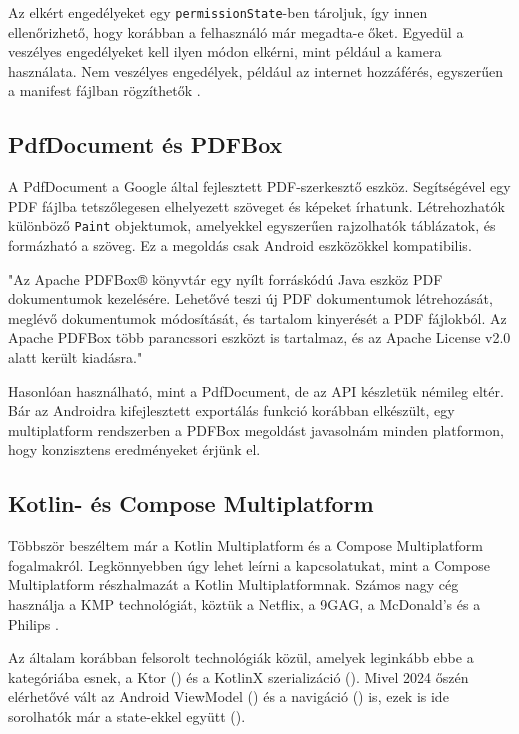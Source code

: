 Az elkért engedélyeket egy \texttt{permissionState}-ben tároljuk, így innen ellenőrizhető, hogy korábban a felhasználó már megadta-e őket.  
Egyedül a veszélyes engedélyeket kell ilyen módon elkérni, mint például a kamera használata.  
Nem veszélyes engedélyek, például az internet hozzáférés, egyszerűen a manifest fájlban rögzíthetők \cite{Permissions}.

\subsection{PdfDocument és PDFBox}

A PdfDocument a Google által fejlesztett PDF-szerkesztő eszköz.  
Segítségével egy PDF fájlba tetszőlegesen elhelyezett szöveget és képeket írhatunk.  
Létrehozhatók különböző \texttt{Paint} objektumok, amelyekkel egyszerűen rajzolhatók táblázatok, és formázható a szöveg.  
Ez a megoldás csak Android eszközökkel kompatibilis.

"Az Apache PDFBox® könyvtár egy nyílt forráskódú Java eszköz PDF dokumentumok kezelésére. Lehetővé teszi új PDF dokumentumok létrehozását, meglévő dokumentumok módosítását, és tartalom kinyerését a PDF fájlokból. Az Apache PDFBox több parancssori eszközt is tartalmaz, és az Apache License v2.0 alatt került kiadásra." \cite{PDFbox}  

Hasonlóan használható, mint a PdfDocument, de az API készletük némileg eltér.  
Bár az Androidra kifejlesztett exportálás funkció korábban elkészült, egy multiplatform rendszerben a PDFBox megoldást javasolnám minden platformon, hogy konzisztens eredményeket érjünk el.

\subsection{Kotlin- és Compose Multiplatform}
\label{sec:KCMP}

Többször beszéltem már a Kotlin Multiplatform és a Compose Multiplatform fogalmakról.  
Legkönnyebben úgy lehet leírni a kapcsolatukat, mint a Compose Multiplatform részhalmazát a Kotlin Multiplatformnak.  
Számos nagy cég használja a KMP technológiát, köztük a Netflix, a 9GAG, a McDonald's és a Philips \cite{KotlinMultiplatformStable}.  

Az általam korábban felsorolt technológiák közül, amelyek leginkább ebbe a kategóriába esnek, a Ktor () és a KotlinX szerializáció ().  
Mivel 2024 őszén elérhetővé vált az Android ViewModel () és a navigáció () is, ezek is ide sorolhatók már a state-ekkel együtt ().  


